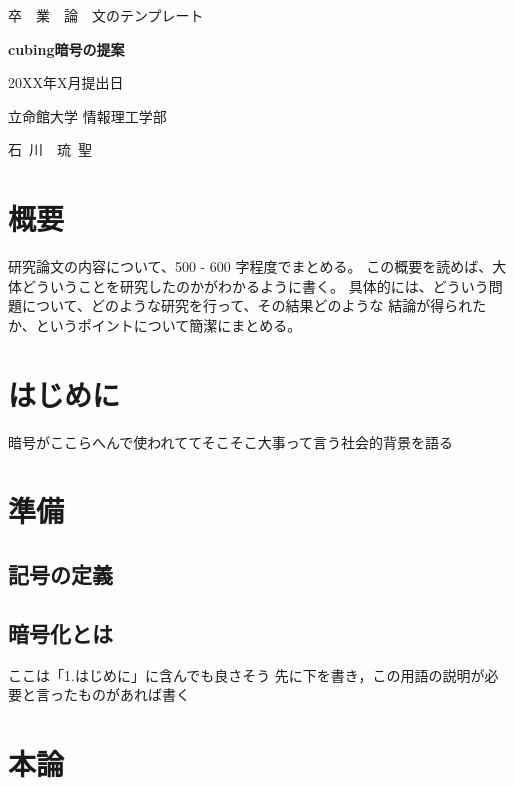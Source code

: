 
\thispagestyle{empty}
\begin{center}
{\huge 卒~~業~~論~~文のテンプレート}
\vspace*{3.5cm}

{\LARGE\bf cubing暗号の提案}
\vspace*{3cm}

{\large 20XX年X月提出日}
\vspace*{3cm}

{\large 立命館大学 情報理工学部}
\vspace*{5mm}

{\Large 石~川~~琉~聖}
\end{center}
\newpage 

\setcounter{page}{1}

\section*{概要}

研究論文の内容について、500 - 600 字程度でまとめる。
この概要を読めば、大体どういうことを研究したのかがわかるように書く。
具体的には、どういう問題について、どのような研究を行って、その結果どのような
結論が得られたか、というポイントについて簡潔にまとめる。

\newpage

\tableofcontents
\clearpage

\section{はじめに}
暗号がここらへんで使われててそこそこ大事って言う社会的背景を語る

\section{準備}
\subsection{記号の定義}
\subsection{暗号化とは}
ここは「1.はじめに」に含んでも良さそう
先に下を書き，この用語の説明が必要と言ったものがあれば書く

\section{本論}
